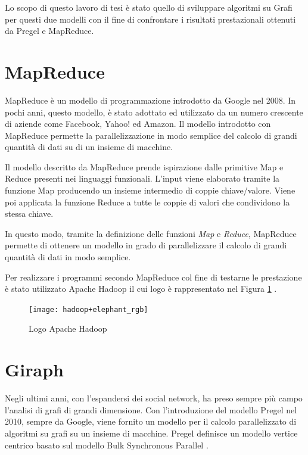 \documentclass[LaM,binding=0.6cm]{sapthesis}
\begin{document}
Lo scopo di questo lavoro di tesi è stato quello di sviluppare algoritmi su Grafi per questi due modelli con il fine di confrontare i risultati prestazionali ottenuti da Pregel e MapReduce.


\section{MapReduce}

MapReduce \cite{Dean:2008:MSD:1327452.1327492} è un modello di programmazione introdotto da Google nel 2008. In pochi anni, questo modello, è stato adottato ed utilizzato da un numero crescente di aziende come Facebook, Yahoo! ed Amazon. Il modello introdotto con MapReduce permette la parallelizzazione in modo semplice del calcolo di grandi quantità di dati su di un insieme di macchine.

Il modello descritto da MapReduce prende ispirazione dalle primitive Map e Reduce presenti nei linguaggi funzionali.  L'input viene elaborato tramite la funzione Map producendo un insieme intermedio di coppie chiave/valore. Viene poi applicata la funzione Reduce a tutte le coppie di valori che condividono la stessa chiave.



In questo modo, tramite la definizione delle funzioni \textit{Map} e \textit{Reduce}, MapReduce permette di ottenere un modello in grado di parallelizzare il calcolo di grandi quantità di dati in modo semplice.

Per realizzare i programmi secondo MapReduce col fine di testarne le prestazione è stato utilizzato Apache Hadoop \cite{1_hadoop.apache.org_2015} il cui logo è rappresentato nel Figura \ref{fig:HadoopLogo} .

\begin{figure}[h]
\centering
\texttt{[image: hadoop+elephant\_rgb]}
\caption{Logo Apache Hadoop}
\label{fig:HadoopLogo}
\end{figure}


\section{Giraph}
Negli ultimi anni, con l'espandersi dei social network, ha preso sempre più campo l'analisi di grafi di grandi dimensione. Con l'introduzione del modello Pregel \cite{Malewicz:2010:PSL:1807167.1807184} nel 2010, sempre da Google, viene fornito un modello per il calcolo parallelizzato di algoritmi su grafi su un insieme di macchine. Pregel definisce un modello vertice centrico basato sul modello Bulk Synchronous Parallel \cite{Valiant:1990:BMP:79173.79181}. 
\end{document}
